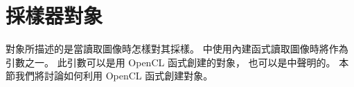 \section{採樣器對象}

對象所描述的是當讀取圖像時怎樣對其採樣。
中使用內建函式讀取圖像時將作為引數之一。
此引數可以是用 OpenCL 函式創建的對象，
也可以是中聲明的。
本節我們將討論如何利用 OpenCL 函式創建對象。




